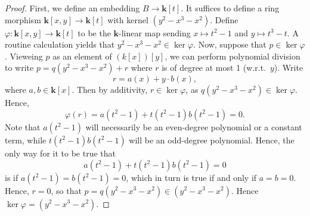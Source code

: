 \documentclass[10pt]{article}
\renewcommand{\k}{\mbf k}
\newcommand{\mbf}[1]{\mathbf{#1}}
\newcommand{\1}{\mbf 1}
\newcommand{\2}{\mbf 2}
\newcommand{\3}{\mbf 3}
\newcommand{\4}{\mbf 4}
\newcommand{\5}{\mbf 5}
\newcommand{\6}{\mbf 6}
\newcommand{\7}{\mbf 7}
\newcommand{\8}{\mbf 8}
\newcommand{\9}{\mbf 9}
\newcommand{\0}{\mbf 0}
\renewcommand{\k}{\mbf k}
\renewcommand{\(}{\left(}
\renewcommand{\)}{\right)}
\begin{document}
\begin{enumerate}[label=(\arabic*)]
\begin{proof}
%
        \pagebreak 
        First, we define an embedding $B\to\k[t]$. It suffices to define a ring morphism $\k[x,y]\to\k[t]$ with kernel $(y^2-x^3-x^2)$. 
        Define $\varphi:\k[x,y]\to\k[t]$ to be the $\k$-linear map sending $x\mapsto t^2-1$ and $y\mapsto t^3-t$. A routine calculation yields that $y^2-x^3-x^2\in\ker\varphi$. Now, suppose that $p\in\ker\varphi$. Vieweing $p$ as an element of $(k[x])[y]$, we can perform polynomial division to write $p=q(y^2-x^3-x^2)+r$ where $r$ is of degree at most 1 (w.r.t.\ $y$). Write
        \[r=a(x)+y\cdot b(x),\]
        where $a,b\in\k[x]$. Then by additivity, $r\in\ker\varphi$, as $q(y^2-x^3-x^2)\in\ker\varphi$. Hence,
        \[\varphi(r)=a(t^2-1)+t(t^2-1)b(t^2-1)=0.\]
        Note that $a(t^2-1)$ will necessarily be an even-degree polynomial or a constant term, while $t(t^2-1)b(t^2-1)$ will be an odd-degree polynomial. Hence, the only way for it to be true that 
        \[a(t^2-1)+t(t^2-1)b(t^2-1)=0\]
        is if $a(t^2-1)=b(t^2-1)=0$, which in turn is true if and only if $a=b=0$. Hence, $r=0$, so that $p=q(y^2-x^3-x^2)\in(y^2-x^3-x^2)$. Hence $\ker\varphi=(y^2-x^3-x^2)$. 


\end{proof}
\end{enumerate}
\end{document}

